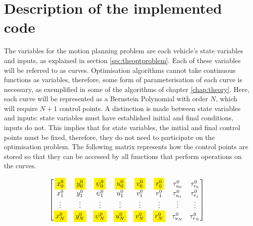 \cleardoublepage
\label{chap:results}


\section{Description of the implemented code}
\label{sec:description_implementation}

\par The variables for the motion planning problem are each vehicle's state variables and inputs, as explained in section \ref{sec:theoptproblem}. Each of these variables will be referred to as curves. Optimisation algorithms cannot take continuous functions as variables, therefore, some form of parameterisation of each curve is necessary, as exemplified in some of the algorithms of chapter \ref{chap:theory}. Here, each curve will be represented as a Bernstein Polynomial with order $N$, which will require $N+1$ control points. A distinction is made between state variables and inputs: state variables must have established initial and final conditions, inputs do not. This implies that for state variables, the initial and final control points must be fixed, therefore, they do not need to participate on the optimisation problem. The following matrix represents how the control points are stored so that they can be accessed by all functions that perform operations on the curves.

\begin{equation}
    \begin{bmatrix}
        \colorbox{yellow}{$\displaystyle x_0^0$} & \colorbox{yellow}{$\displaystyle y_0^0$} & \colorbox{yellow}{$\displaystyle \psi_0^0$} & \colorbox{yellow}{$\displaystyle u_0^0$} & \colorbox{yellow}{$\displaystyle v_0^0$} & \colorbox{yellow}{$\displaystyle r_0^0$} & \tau_{u_0}^0 & \tau_{r_0}^0 \\
        x_1^0 & y_1^0 & \psi_1^0 & u_1^0 & v_1^0 & r_1^0 & \tau_{u_1}^0 & \tau_{r_1}^0 \\
        \vdots & \vdots & \vdots & \vdots & \vdots & \vdots & \vdots & \vdots \\
        \colorbox{yellow}{$x_{N}^0$} & \colorbox{yellow}{$y_{N}^0$} & \colorbox{yellow}{$\psi_{N}^0$} & \colorbox{yellow}{$u_{N}^0$} & \colorbox{yellow}{$v_{N}^0$} & \colorbox{yellow}{$r_{N}^0$} & \tau_{u_{N}}^0 & \tau_{r_{N}}^0
    \end{bmatrix}
    \label{eq:matrixofvariables}
\end{equation}

